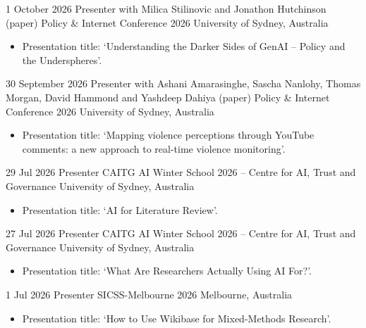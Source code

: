 \documentclass[12pt,a4paper,sans]{moderncv}
\begin{document}
\cventry
{1 October 2026}
{Presenter with Milica Stilinovic and Jonathon Hutchinson (paper)}
{Policy \& Internet Conference 2026}
{University of Sydney, Australia}
{}
{
\begin{itemize} %
\item {Presentation title: `Understanding the Darker Sides of GenAI -- Policy and the Underspheres'. \href{https://francescobailo.net/4L5CY88E/}{\faLink}}
\end{itemize}
}

\cventry
{30 September 2026}
{Presenter with Ashani Amarasinghe, Sascha Nanlohy, Thomas Morgan, David Hammond and Yashdeep Dahiya (paper)}
{Policy \& Internet Conference 2026}
{University of Sydney, Australia}
{}
{
\begin{itemize} %
\item {Presentation title: `Mapping violence perceptions through YouTube comments: a new approach to real-time violence monitoring'. \href{https://fraba.github.io/presentation/2026-PI}{\faLink}}
\end{itemize}
}

\cventry
{29 Jul 2026}
{Presenter}
{CAITG AI Winter School 2026 -- Centre for AI, Trust and Governance}
{University of Sydney, Australia}
{}
{
\begin{itemize} %
\item {Presentation title: `AI for Literature Review'. \href{https://fraba.github.io/presentation/2026-CAITG-AI-Winter-School/day2/wagner-lecture-slides.html}{\faLink}}
\end{itemize}
}

\cventry
{27 Jul 2026}
{Presenter}
{CAITG AI Winter School 2026 -- Centre for AI, Trust and Governance}
{University of Sydney, Australia}
{}
{
\begin{itemize} %
\item {Presentation title: `What Are Researchers Actually Using AI For?'. \href{https://fraba.github.io/presentation/2026-CAITG-AI-Winter-School/day1-how-researchers-use-ai.html}{\faLink}}
\end{itemize}
}

\cventry
{1 Jul 2026}
{Presenter}
{SICSS-Melbourne 2026}
{Melbourne, Australia}
{}
{
\begin{itemize} %
\item {Presentation title: `How to Use Wikibase for Mixed-Methods Research'. \href{https://github.com/fraba/wikibase-mixed-methods-research/}{\faLink}}
\end{itemize}
}
\end{document}
